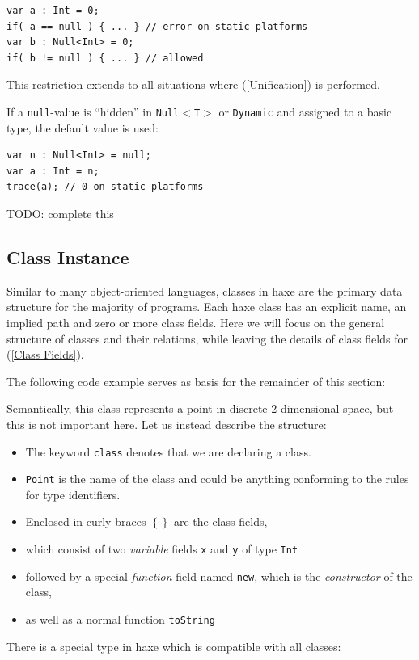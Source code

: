 \documentclass{article}
\newcommand{\type}[1]{\texttt{#1}}
\newcommand{\expr}[1]{\texttt{#1}}
\newcommand{\fullref}[1]{\nameref{#1} (\cref{#1})}
\newcommand{\todo}[1]{TODO: #1}
\begin{document}
\begin{lstlisting}
var a : Int = 0;
if( a == null ) { ... } // error on static platforms
var b : Null<Int> = 0;
if( b != null ) { ... } // allowed
\end{lstlisting}
This restriction extends to all situations where \fullref{Unification} is performed.

If a \expr{null}-value is ``hidden'' in \type{Null$<$T$>$} or \type{Dynamic} and assigned to a basic type, the default value is used:

\begin{lstlisting}
var n : Null<Int> = null;
var a : Int = n;
trace(a); // 0 on static platforms
\end{lstlisting}

\todo{complete this}


\subsection{Class Instance}
\label{Class Instance}

Similar to many object-oriented languages, classes in haxe are the primary data structure for the majority of programs. Each haxe class has an explicit name, an implied path and zero or more class fields. Here we will focus on the general structure of classes and their relations, while leaving the details of class fields for \fullref{Class Fields}.

The following code example serves as basis for the remainder of this section:


Semantically, this class represents a point in discrete 2-dimensional space, but this is not important here. Let us instead describe the structure:

\begin{itemize}
	\item The keyword \expr{class} denotes that we are declaring a class.
	\item \type{Point} is the name of the class and could be anything conforming to the rules for type identifiers.
	\item Enclosed in curly braces \expr{$\left\{\right\}$} are the class fields,
	\item which consist of two \emph{variable} fields \expr{x} and \expr{y} of type \type{Int}
	\item followed by a special \emph{function} field named \expr{new}, which is the \emph{constructor} of the class,
	\item as well as a normal function \expr{toString}
\end{itemize}
There is a special type in haxe which is compatible with all classes:
\end{document}
